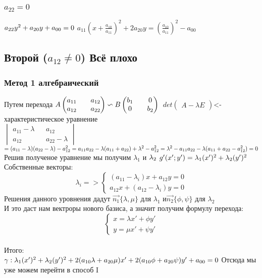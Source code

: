 \documentclass{book}
\begin{document}
\subsubsection{$a_22=0$}
$a_{22}y^2+a_{20}y+a_{00}=0\\$
$a_{11}(x+\frac{a_{10}}{a_{11}})^2+2a_{20}y=(\frac{a_{10}}{a_{11}})^2-a_{00}$
\subsection{Второй ($a_{12} \neq 0$) Всё плохо}
\subsubsection{Метод 1 алгебраический}
Путем перехода
$A\begin{pmatrix}
    {a_{11}} && {a_{12}}\\
    {a_{12}} && {a_{22}}
\end{pmatrix}
\backsim B
\begin{pmatrix}
    {b_1} && {0}\\
    {0} && {b_{2}}
\end{pmatrix}\\
$
$
det\begin{pmatrix}
    A-\lambda E
\end{pmatrix}
$<- характеристическое уравнение\\
$
\begin{vmatrix}
    {a_{11}-\lambda} && {a_{12}}\\
    {a_{12}} && {a_{22}-\lambda}
\end{vmatrix}$
$
=(a_{11}-\lambda)(a_{22}-\lambda)-a_{12}^2=a_{11}a_{22}-\lambda(a_{11}+a_{22})+\lambda^2-a_{12}^2=\lambda^2-a_{11}a_{22}-\lambda(a_{11}+a_{22}-a_{12}^2)=0\\
$
Решив полученое уравнение мы получим $\lambda_1$ и $\lambda_2\\$
$g'(x';y')=\lambda_1(x')^2+\lambda_2(y')^2\\$
Собственные векторы:\\
\begin{equation}\lambda_i=>
    \begin{cases}
        (a_{11}-\lambda_i)x+a_{12}y=0\\
        a_{12}x+(a_{12}-\lambda_i)y=0
    \end{cases}
\end{equation}
Решения данного уровнения дадут $\overrightarrow{n_1}\{\lambda,\mu\}$ для $\lambda_1$ и$\overrightarrow{n_2}\{\phi,\psi\}$ для $\lambda_2$\\
И это даст нам вектроры нового базиса, а значит получим формулу перехода:\\
\begin{equation}
    \begin{cases}
        x=\lambda x'+\phi y'\\
        y=\mu x'+\psi y'
    \end{cases}
\end{equation}\\
Итого:\\
$\gamma: \lambda_1(x')^2+\lambda_2(y')^2+2(a_{10}\lambda+a_{20}\mu)x'+2(a_{10}\phi+a_{20}\psi)y'+a_{00}=0\\$
Отсюда мы уже можем перейти в способ I\\
\end{document}
